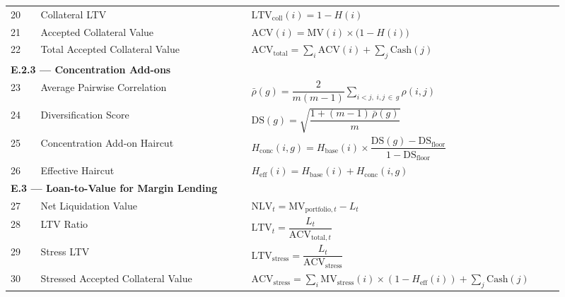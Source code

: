 \documentclass[9pt, a4paper]{extarticle}
\begin{document}
\begin{longtable}{p{0.05\linewidth} p{0.35\linewidth} p{0.52\linewidth}}
20
    & Collateral LTV
    & $\displaystyle \mathrm{LTV}_{\mathrm{coll}}(i) = 1 - H(i)$ \\[6pt]

21
    & Accepted Collateral Value
    & $\displaystyle \mathrm{ACV}(i) = \mathrm{MV}(i) \times \bigl(1 - H(i)\bigr)$ \\[6pt]

22
    & Total Accepted Collateral Value
    & $\displaystyle \mathrm{ACV}_{\mathrm{total}} =
       \sum_{i} \mathrm{ACV}(i) + \sum_{j} \mathrm{Cash}(j)$ \\[6pt]


\multicolumn{3}{l}{\textbf{E.2.3 — Concentration Add-ons}} \\[2pt]

23
    & Average Pairwise Correlation
    & $\displaystyle \bar{\rho}(g) =
       \dfrac{2}{m(m-1)}
       \sum_{i < j,\; i,j\,\in\, g} \rho(i,j)$ \\[8pt]

24
    & Diversification Score
    & $\displaystyle \mathrm{DS}(g) =
       \sqrt{\dfrac{1 + (m-1)\,\bar{\rho}(g)}{m}}$ \\[8pt]

25
    & Concentration Add-on Haircut
    & $\displaystyle H_{\mathrm{conc}}(i,g) =
       H_{\mathrm{base}}(i)
       \times \dfrac{\mathrm{DS}(g) - \mathrm{DS}_{\mathrm{floor}}}
                    {1 - \mathrm{DS}_{\mathrm{floor}}}$ \\[8pt]

26
    & Effective Haircut
    & $\displaystyle H_{\mathrm{eff}}(i) =
       H_{\mathrm{base}}(i) + H_{\mathrm{conc}}(i,g)$ \\[6pt]


\multicolumn{3}{l}{\textbf{E.3 — Loan-to-Value for Margin Lending}} \\[2pt]

27
    & Net Liquidation Value
    & $\displaystyle \mathrm{NLV}_t =
       \mathrm{MV}_{\mathrm{portfolio},t} - L_t$ \\[6pt]

28
    & LTV Ratio
    & $\displaystyle \mathrm{LTV}_t =
       \dfrac{L_t}{\mathrm{ACV}_{\mathrm{total},t}}$ \\[8pt]

29
    & Stress LTV
    & $\displaystyle \mathrm{LTV}_{\mathrm{stress}} =
       \dfrac{L_t}{\mathrm{ACV}_{\mathrm{stress}}}$ \\[6pt]

30
    & Stressed Accepted Collateral Value
    & $\displaystyle \mathrm{ACV}_{\mathrm{stress}} =
       \sum_{i} \mathrm{MV}_{\mathrm{stress}}(i)
       \times (1 - H_{\mathrm{eff}}(i))
       + \sum_{j} \mathrm{Cash}(j)$ \\[6pt]

\end{longtable}
\end{document}
